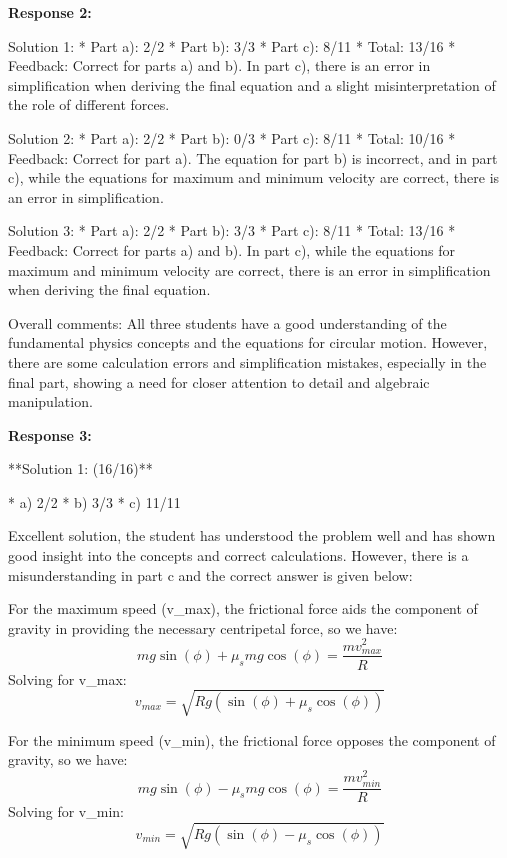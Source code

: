 \documentclass[a4paper,11pt]{article}
\begin{document}
\bigskip    
\textbf{Response 2:}

Solution 1: 
* Part a): 2/2
* Part b): 3/3
* Part c): 8/11
* Total: 13/16
* Feedback: Correct for parts a) and b). In part c), there is an error in simplification when deriving the final equation and a slight misinterpretation of the role of different forces.

Solution 2:
* Part a): 2/2
* Part b): 0/3
* Part c): 8/11
* Total: 10/16
* Feedback: Correct for part a). The equation for part b) is incorrect, and in part c), while the equations for maximum and minimum velocity are correct, there is an error in simplification.

Solution 3:
* Part a): 2/2
* Part b): 3/3
* Part c): 8/11
* Total: 13/16
* Feedback: Correct for parts a) and b). In part c), while the equations for maximum and minimum velocity are correct, there is an error in simplification when deriving the final equation.

Overall comments: All three students have a good understanding of the fundamental physics concepts and the equations for circular motion. However, there are some calculation errors and simplification mistakes, especially in the final part, showing a need for closer attention to detail and algebraic manipulation.

\bigskip    
\textbf{Response 3:}

**Solution 1: (16/16)**

*   a) 2/2
*   b) 3/3
*   c) 11/11

Excellent solution, the student has understood the problem well and has shown good insight into the concepts and correct calculations. However, there is a misunderstanding in part c and the correct answer is given below:

For the maximum speed (v_{max}), the frictional force aids the component of gravity in providing the necessary centripetal force, so we have:
$$mg\sin(\phi) + \mu_smg\cos(\phi) = \frac{mv_{max}^2}{R}$$
Solving for v_{max}:
$$v_{max} = \sqrt{Rg(\sin(\phi) + \mu_s \cos(\phi))}$$

For the minimum speed (v_{min}), the frictional force opposes the component of gravity, so we have:
$$mg\sin(\phi) - \mu_smg\cos(\phi) = \frac{mv_{min}^2}{R}$$
Solving for v_{min}:
$$v_{min} = \sqrt{Rg(\sin(\phi) - \mu_s \cos(\phi))}$$
\end{document}
